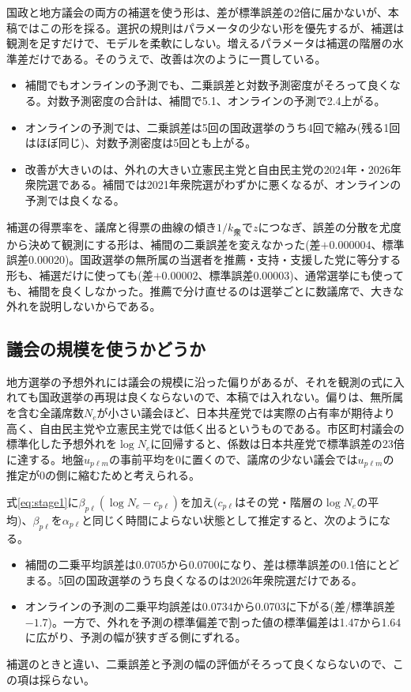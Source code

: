 \documentclass[a4paper,11pt]{ltjsarticle}
\begin{document}
国政と地方議会の両方の補選を使う形は、差が標準誤差の2倍に届かないが、本稿ではこの形を採る。選択の規則はパラメータの少ない形を優先するが、補選は観測を足すだけで、モデルを柔軟にしない。増えるパラメータは補選の階層の水準差だけである。そのうえで、改善は次のように一貫している。
\begin{itemize}
  \item 補間でもオンラインの予測でも、二乗誤差と対数予測密度がそろって良くなる。対数予測密度の合計は、補間で5.1、オンラインの予測で2.4上がる。
  \item オンラインの予測では、二乗誤差は5回の国政選挙のうち4回で縮み(残る1回はほぼ同じ)、対数予測密度は5回とも上がる。
  \item 改善が大きいのは、外れの大きい立憲民主党と自由民主党の2024年・2026年衆院選である。補間では2021年衆院選がわずかに悪くなるが、オンラインの予測では良くなる。
\end{itemize}

補選の得票率を、議席と得票の曲線の傾き$1/k_{\text{衆}}$で$z$につなぎ、誤差の分散を尤度から決めて観測にする形は、補間の二乗誤差を変えなかった(差$+0.000004$、標準誤差0.00020)。国政選挙の無所属の当選者を推薦・支持・支援した党に等分する形も、補選だけに使っても(差$+0.00002$、標準誤差0.00003)、通常選挙にも使っても、補間を良くしなかった。推薦で分け直せるのは選挙ごとに数議席で、大きな外れを説明しないからである。

\subsection{議会の規模を使うかどうか}
\label{sec:size_valid}

地方選挙の予想外れには議会の規模に沿った偏りがあるが、それを観測の式に入れても国政選挙の再現は良くならないので、本稿では入れない。偏りは、無所属を含む全議席数$N_e$が小さい議会ほど、日本共産党では実際の占有率が期待より高く、自由民主党や立憲民主党では低く出るというものである。市区町村議会の標準化した予想外れを$\log N_e$に回帰すると、係数は日本共産党で標準誤差の23倍に達する。地盤$u_{p\ell m}$の事前平均を0に置くので、議席の少ない議会では$u_{p\ell m}$の推定が0の側に縮むためと考えられる。

式\eqref{eq:stage1}に$\beta_{p\ell}(\log N_e-c_{p\ell})$を加え($c_{p\ell}$はその党・階層の$\log N_e$の平均)、$\beta_{p\ell}$を$\alpha_{p\ell}$と同じく時間によらない状態として推定すると、次のようになる。
\begin{itemize}
  \item 補間の二乗平均誤差は0.0705から0.0700になり、差は標準誤差の0.1倍にとどまる。5回の国政選挙のうち良くなるのは2026年衆院選だけである。
  \item オンラインの予測の二乗平均誤差は0.0734から0.0703に下がる(差/標準誤差$-1.7$)。一方で、外れを予測の標準偏差で割った値の標準偏差は1.47から1.64に広がり、予測の幅が狭すぎる側にずれる。
\end{itemize}
補選のときと違い、二乗誤差と予測の幅の評価がそろって良くならないので、この項は採らない。
\end{document}
